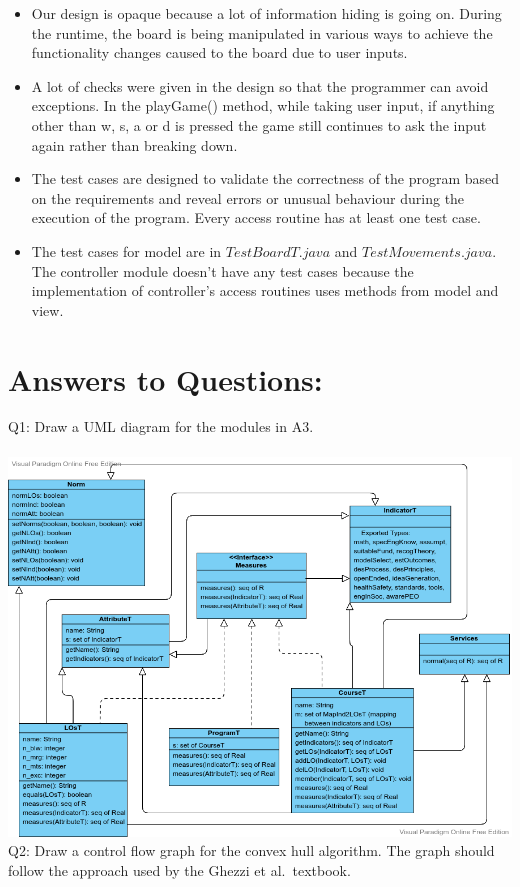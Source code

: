 \documentclass[12pt]{article}
\begin{document}
\begin{itemize}
    \item Our design is opaque because a lot of information hiding is going on. During the runtime, the board is being manipulated in various ways to achieve the functionality changes caused to the board due to user inputs.
    \item A lot of checks were given in the design so that the programmer can avoid exceptions. In the playGame() method, while taking user input, if anything other than w, s, a or d is pressed the game still continues to ask the input again rather than breaking down.
    \item The test cases are designed to validate the correctness of the program based on the requirements and reveal errors or unusual behaviour during the execution of the program. Every access routine has at least one test case. 
    \item The test cases for model are in $TestBoardT.java$ and $TestMovements.java$. The controller module doesn't have any test cases because the implementation of controller's access routines uses methods from model and view.
\end{itemize}

\section*{Answers to Questions:}
Q1: Draw a UML diagram for the modules in A3.\\\\
\includegraphics[width=1\textwidth]{A3-UML.png}
\newpage
Q2: Draw a control flow graph for the convex hull algorithm.  The graph should follow the approach used by the Ghezzi et al.\ textbook.\\
\end{document}
